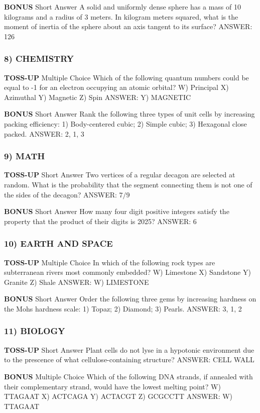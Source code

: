 \documentclass{article}
\begin{document}
\textbf{BONUS}
Short Answer A solid and uniformly dense sphere has a mass of 10 kilograms and a radius of 3 meters. In kilogram meters squared, what is the moment of inertia of the sphere about an axis tangent to its surface?
ANSWER: 126

\subsubsection*{8) CHEMISTRY}
\textbf{TOSS-UP}
Multiple Choice Which of the following quantum numbers could be equal to -1 for an electron occupying an atomic orbital?
W) Principal
X) Azimuthal
Y) Magnetic
Z) Spin
ANSWER: Y) MAGNETIC

\textbf{BONUS}
Short Answer Rank the following three types of unit cells by increasing packing efficiency: 1) Body-centered cubic; 2) Simple cubic; 3) Hexagonal close packed.
ANSWER: 2, 1, 3

\subsubsection*{9) MATH}
\textbf{TOSS-UP}
Short Answer Two vertices of a regular decagon are selected at random. What is the probability that the segment connecting them is not one of the sides of the decagon?
ANSWER: $7/9$

\textbf{BONUS}
Short Answer How many four digit positive integers satisfy the property that the product of their digits is 2025?
ANSWER: 6

\subsubsection*{10) EARTH AND SPACE}
\textbf{TOSS-UP}
Multiple Choice In which of the following rock types are subterranean rivers most commonly embedded?
W) Limestone
X) Sandstone
Y) Granite
Z) Shale
ANSWER: W) LIMESTONE

\textbf{BONUS}
Short Answer Order the following three gems by increasing hardness on the Mohs hardness scale: 1) Topaz; 2) Diamond; 3) Pearls.
ANSWER: 3, 1, 2

\subsubsection*{11) BIOLOGY}
\textbf{TOSS-UP}
Short Answer Plant cells do not lyse in a hypotonic environment due to the prescence of what cellulose-containing structure?
ANSWER: CELL WALL

\textbf{BONUS}
Multiple Choice Which of the following DNA strands, if annealed with their complementary strand, would have the lowest melting point?
W) TTAGAAT
X) ACTCAGA
Y) ACTACGT
Z) GCGCCTT
ANSWER: W) TTAGAAT
\end{document}

